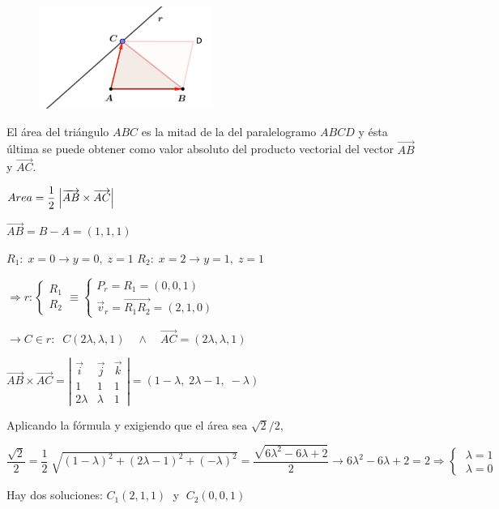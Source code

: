 \begin{proofw}\renewcommand{\qedsymbol}{$\diamond$}	

\begin{multicols}{2}
	\begin{figure}[H]
		\centering
		\includegraphics[width=0.5\textwidth]{imagenes/imagenes11/T11IM30.png}
	\end{figure}
\noindent El área del triángulo $ABC$ es la mitad de la del paralelogramo $ABCD$ y ésta última se puede obtener como valor absoluto del producto vectorial del vector $\overrightarrow{AB}$ y $\overrightarrow{AC}$.
\end{multicols}
\noindent $Area=\dfrac 1 2 \; \abs{\overrightarrow{AB} \times \overrightarrow{AC}}$

\noindent $\overrightarrow{AB}=B-A=(1,1,1)$

\noindent $R_1: \;x=0\to y=0,\; z=1$ 
\noindent $R_2: \; x=2\to y=1,\; z=1$

\noindent $\Rightarrow r:\begin{cases}R_1\\R_2 \end{cases}$\hspace{-3mm}$\equiv \begin{cases} P_r=R_1=(0,0,1)\\ \vec v_r=\overrightarrow{R_1R_2}=(2,1,0)\end{cases}$


\noindent $ \to C\in r:\;\; C(2\lambda,\lambda,1)\quad \wedge \quad \overrightarrow{AC}=(2\lambda,\lambda,1)$

\noindent $\overrightarrow{AB} \times \overrightarrow{AC}=\left| \begin{matrix} \vec i&\vec j&\vec k \\1&1&1\\2\lambda&\lambda&1 \end{matrix}\right|=(1-\lambda,\; 2\lambda-1,\; -\lambda)$

\noindent Aplicando la fórmula y exigiendo que el área sea $\sqrt{2}/2$,

\noindent $\dfrac {\sqrt{2}} {2} = \dfrac 1 2 \; \sqrt{(1-\lambda)^2+(2\lambda-1)^2+(-\lambda)^2}=\dfrac{\sqrt{6\lambda^2-6\lambda+2}}{2} \to 6\lambda^2-6\lambda+2=2 \Rightarrow \begin{cases} \; \lambda=1\\\;\lambda=0\end{cases}$

\noindent Hay dos soluciones: $C_1(2,1,1)\;$ y $\; C_2(0,0,1)$

\end{proofw}


